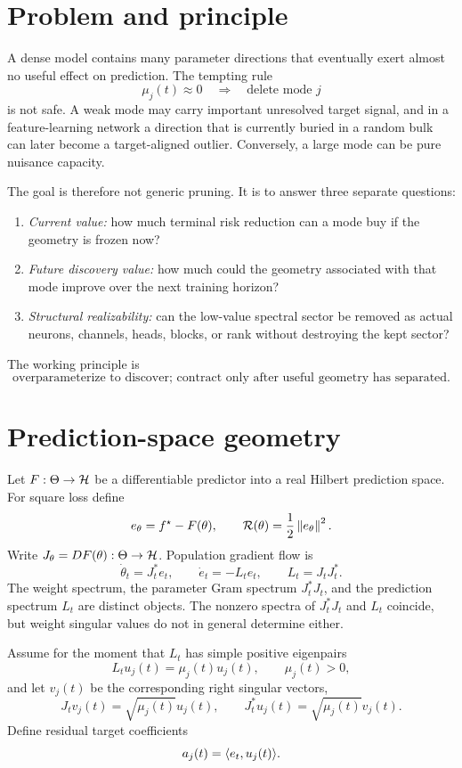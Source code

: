 \section{Problem and principle}
A dense model contains many parameter directions that eventually exert almost no useful effect on prediction. The tempting rule
\[
\mu_j(t)\approx 0 \quad\Longrightarrow\quad \text{delete mode }j
\]
is not safe. A weak mode may carry important unresolved target signal, and in a feature-learning network a direction that is currently buried in a random bulk can later become a target-aligned outlier. Conversely, a large mode can be pure nuisance capacity.

The goal is therefore not generic pruning. It is to answer three separate questions:
\begin{enumerate}[label=(\roman*)]
\item \emph{Current value:} how much terminal risk reduction can a mode buy if the geometry is frozen now?
\item \emph{Future discovery value:} how much could the geometry associated with that mode improve over the next training horizon?
\item \emph{Structural realizability:} can the low-value spectral sector be removed as actual neurons, channels, heads, blocks, or rank without destroying the kept sector?
\end{enumerate}
The working principle is
\[
\boxed{\text{overparameterize to discover; contract only after useful geometry has separated.}}
\]

\section{Prediction-space geometry}
Let $F:\Theta\to\mathcal H$ be a differentiable predictor into a real Hilbert prediction space. For square loss define
\[
e_\theta=f^\star-F(\theta),\qquad \mathcal R(\theta)=\frac12\left\lVert e_\theta\right\rVert^2.
\]
Write $J_\theta=DF(\theta):\Theta\to\mathcal H$. Population gradient flow is
\[
\dot\theta_t=J_t^\ast e_t,
\qquad
\dot e_t=-L_t e_t,
\qquad
L_t=J_tJ_t^\ast.
\]
The weight spectrum, the parameter Gram spectrum $J_t^\ast J_t$, and the prediction spectrum $L_t$ are distinct objects. The nonzero spectra of $J_t^\ast J_t$ and $L_t$ coincide, but weight singular values do not in general determine either.

Assume for the moment that $L_t$ has simple positive eigenpairs
\[
L_tu_j(t)=\mu_j(t)u_j(t),\qquad \mu_j(t)>0,
\]
and let $v_j(t)$ be the corresponding right singular vectors,
\[
J_tv_j(t)=\sqrt{\mu_j(t)}u_j(t),
\qquad
J_t^\ast u_j(t)=\sqrt{\mu_j(t)}v_j(t).
\]
Define residual target coefficients
\[
a_j(t)=\langle e_t,u_j(t)\rangle.
\]

